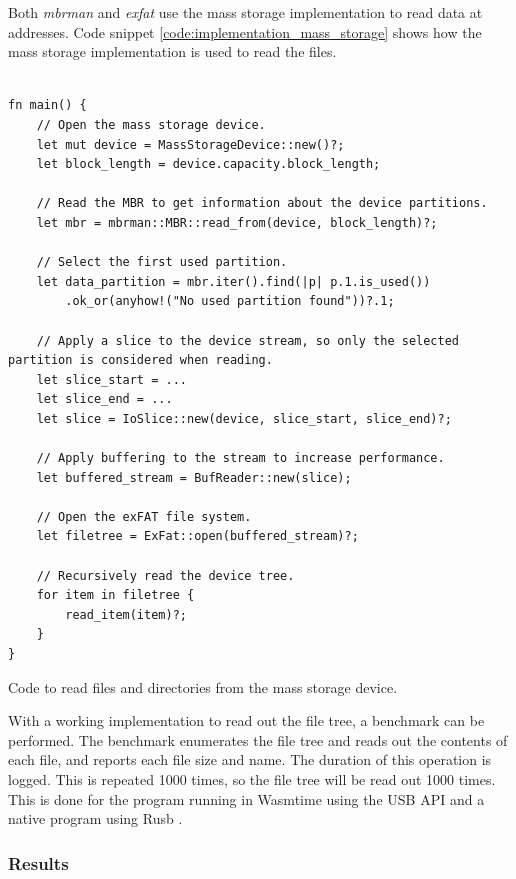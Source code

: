 Both \textit{mbrman} and \textit{exfat} use the mass storage implementation to read data at addresses. Code snippet \ref{code:implementation_mass_storage} shows how the mass storage implementation is used to read the files.

\begin{code}
\begin{verbatim}

fn main() {
    // Open the mass storage device.
    let mut device = MassStorageDevice::new()?;
    let block_length = device.capacity.block_length;

    // Read the MBR to get information about the device partitions.
    let mbr = mbrman::MBR::read_from(device, block_length)?;

    // Select the first used partition.
    let data_partition = mbr.iter().find(|p| p.1.is_used())
        .ok_or(anyhow!("No used partition found"))?.1;

    // Apply a slice to the device stream, so only the selected partition is considered when reading.
    let slice_start = ...
    let slice_end = ...
    let slice = IoSlice::new(device, slice_start, slice_end)?;

    // Apply buffering to the stream to increase performance.
    let buffered_stream = BufReader::new(slice);
    
    // Open the exFAT file system.
    let filetree = ExFat::open(buffered_stream)?;

    // Recursively read the device tree.
    for item in filetree {
        read_item(item)?;
    }
}
\end{verbatim}
\caption{Code to read files and directories from the mass storage device.}
\label{code:implementation_mass_storage}
\end{code}

With a working implementation to read out the file tree, a benchmark can be performed. The benchmark enumerates the file tree and reads out the contents of each file, and reports each file size and name. The duration of this operation is logged. This is repeated 1000 times, so the file tree will be read out 1000 times. This is done for the program running in Wasmtime using the \acrshort{USB} \acrshort{API} and a native program using Rusb \cite{rusb}.

\subsubsection{Results}

